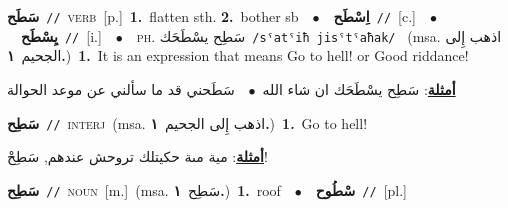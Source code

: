 \documentclass[10pt,a4paper,twoside]{article} %
\begin{document}
\begin{multicols}{2}
{\setlength\topsep{0pt}\textbf{\foreignlanguage{arabic}{سَطَح}}\ {\color{gray}\texttt{//}\color{black}}\ \textsc{verb}\ [p.]\ \textbf{1.}~flatten sth.  \textbf{2.}~bother sb\ \ $\bullet$\ \ \setlength\topsep{0pt}\textbf{\foreignlanguage{arabic}{اِسْطَح}}\ {\color{gray}\texttt{//}\color{black}}\ [c.]\ \ $\bullet$\ \ \setlength\topsep{0pt}\textbf{\foreignlanguage{arabic}{يِسْطَح}}\ {\color{gray}\texttt{//}\color{black}}\ [i.]\ \ $\bullet$\ \ \textsc{ph.} \color{gray} \foreignlanguage{arabic}{سَطِح يسْطَحَك}\color{black}\ {\color{gray}\texttt{/{\sffamily sˤatˤiħ jisˤtˤaħak}/}\color{black}}\ \color{gray} (msa. \foreignlanguage{arabic}{اذهب إِلى الجحيم}~\foreignlanguage{arabic}{\textbf{١.}})\color{black}\ \textbf{1.}~It is an expression that means Go to hell! or Good riddance!\  \begin{flushright}\color{gray}\foreignlanguage{arabic}{\textbf{\underline{\foreignlanguage{arabic}{أمثلة}}}: سَطِح يسْطَحَك ان شاء الله\ $\bullet$\ \  سَطَحني قد ما سألني عن موعد الحوالة}\end{flushright}\color{black}} \vspace{2mm}

{\setlength\topsep{0pt}\textbf{\foreignlanguage{arabic}{سَطِح}}\ {\color{gray}\texttt{//}\color{black}}\ \textsc{interj}\ \color{gray}(msa. \foreignlanguage{arabic}{اذهب إِلى الجحيم}~\foreignlanguage{arabic}{\textbf{١.}})\color{black}\ \textbf{1.}~Go to hell!\  \begin{flushright}\color{gray}\foreignlanguage{arabic}{\textbf{\underline{\foreignlanguage{arabic}{أمثلة}}}: مية مىة حكيتلك تروحش عندهم, سَطِحْ!}\end{flushright}\color{black}} \vspace{2mm}

{\setlength\topsep{0pt}\textbf{\foreignlanguage{arabic}{سَطِح}}\ {\color{gray}\texttt{//}\color{black}}\ \textsc{noun}\ [m.]\ \color{gray}(msa. \foreignlanguage{arabic}{سَطِح}~\foreignlanguage{arabic}{\textbf{١.}})\color{black}\ \textbf{1.}~roof\ \ $\bullet$\ \ \setlength\topsep{0pt}\textbf{\foreignlanguage{arabic}{سْطُوح}}\ {\color{gray}\texttt{//}\color{black}}\ [pl.]\ } \vspace{2mm}


\end{multicols}
\end{document}
